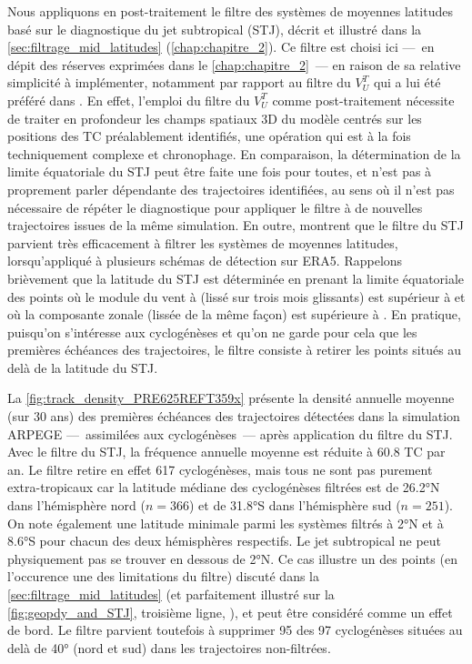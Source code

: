 \documentclass[../main.tex]{subfiles}
\begin{document}
Nous appliquons en post-traitement le filtre des systèmes de moyennes latitudes basé sur le diagnostique du jet subtropical (STJ), décrit et illustré dans la
\cref{sec:filtrage_mid_latitudes} (\cref{chap:chapitre_2}). Ce filtre est choisi ici ---~en dépit des réserves exprimées dans le \cref{chap:chapitre_2}~--- en
raison de sa relative simplicité à implémenter, notamment par rapport au filtre du $V_U^T$ qui a lui été préféré dans \textcite{dulac_assessing_2023}. En effet,
l'emploi du filtre du $V_U^T$ comme post-traitement nécessite de traiter en profondeur les champs spatiaux 3D du modèle centrés sur les positions des TC
préalablement identifiés, une opération qui est à la fois techniquement complexe et chronophage. En comparaison, la détermination de la limite équatoriale du
STJ peut être faite une fois pour toutes, et n'est pas à proprement parler dépendante des trajectoires identifiées, au sens où il n'est pas nécessaire de
répéter le diagnostique pour appliquer le filtre à de nouvelles trajectoires issues de la même simulation. En outre, \textcite{bourdin_intercomparison_2022}
montrent que le filtre du STJ parvient très efficacement à filtrer les systèmes de moyennes latitudes, lorsqu'appliqué à plusieurs schémas de détection sur
ERA5. Rappelons brièvement que la latitude du STJ est déterminée en prenant la limite équatoriale des points où le module du vent à  (lissé sur trois
mois glissants) est supérieur à  et où la composante zonale (lissée de la même façon) est supérieure à . En pratique, puisqu'on s'intéresse aux
cyclogénèses et qu'on ne garde pour cela que les premières échéances des trajectoires, le filtre consiste à retirer les points situés au delà de la latitude du
STJ.

La \cref{fig:track_density_PRE625REFT359x} présente la densité annuelle moyenne (sur \num{30} ans) des premières échéances des trajectoires détectées dans la
simulation ARPEGE ---~assimilées aux cyclogénèses~--- après application du filtre du STJ. Avec le filtre du STJ, la fréquence annuelle moyenne est réduite à
\num{60.8} TC par an. Le filtre retire en effet \num{617} cyclogénèses, mais tous ne sont pas purement extra-tropicaux car la latitude médiane des cyclogénèses
filtrées est de \ang{26.2}N dans l'hémisphère nord ($n = \num{366}$) et de \ang{31.8}S dans l'hémisphère sud ($n=251$). On note également une latitude minimale
parmi les systèmes filtrés à \ang{2}N et à \ang{8.6}S pour chacun des deux hémisphères respectifs. Le jet subtropical ne peut physiquement pas se trouver en
dessous de \ang{2}N. Ce cas illustre un des points (en l'occurence une des limitations du filtre) discuté dans la \cref{sec:filtrage_mid_latitudes} (et
parfaitement illustré sur la \cref{fig:geopdy_and_STJ}, troisième ligne, ), et peut être considéré comme un effet de bord. Le
filtre parvient toutefois à supprimer \num{95} des \num{97} cyclogénèses situées au delà de \ang{40} (nord et sud) dans les trajectoires non-filtrées.
\end{document}

